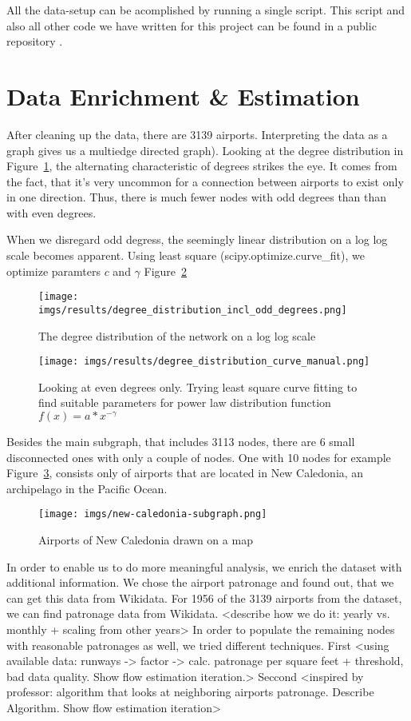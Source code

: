 \documentclass[twocolumn]{tum-article}
\begin{document}
All the data-setup can be acomplished by running a single script.
This script and also all other code we have written for this project can be found in a public repository \cite{repository}.

\section{Data Enrichment \& Estimation}
After cleaning up the data, there are 3139 airports. 
Interpreting the data as a graph gives us a multiedge directed graph).
Looking at the degree distribution in Figure~\ref{fig:degree_distribution}, the alternating characteristic of degrees strikes the eye. It comes from the fact, that it's very uncommon for a connection between airports to exist only in one direction. Thus, there is much fewer nodes with odd degrees than than with even degrees. 

When we disregard odd degress, the seemingly linear distribution on a log log scale becomes apparent. Using least square (scipy.optimize.curve\_fit), we optimize paramters $c$ and $\gamma$ Figure~\ref{fig:degree_distribution_curves}

\begin{figure}
	\centering
	\texttt{[image: imgs/results/degree\_distribution\_incl\_odd\_degrees.png]}
	\caption{
The degree distribution of the network on a log log scale }
	\label{fig:degree_distribution}
\end{figure}

\begin{figure}
	\centering
	\texttt{[image: imgs/results/degree\_distribution\_curve\_manual.png]}
	\caption{
Looking at even degrees only. Trying least square curve fitting to find suitable parameters for power law distribution function $f(x) = a * x^{-\gamma}$}
	\label{fig:degree_distribution_curves}
\end{figure}

Besides the main subgraph, that includes 3113 nodes, there are 6 small disconnected ones with only a couple of nodes.
One with 10 nodes for example Figure~\ref{fig:new_caledonia}, consists only of airports that are located in New Caledonia, an archipelago in the Pacific Ocean. 
\begin{figure}
	\centering
	\texttt{[image: imgs/new-caledonia-subgraph.png]}
	\caption{Airports of New Caledonia drawn on a map}
	\label{fig:new_caledonia}
\end{figure}

In order to enable us to do more meaningful analysis, we enrich the dataset with additional information. We chose the airport patronage and found out, that we can get this data from Wikidata. 
For 1956 of the 3139 airports from the dataset, we can find patronage data from Wikidata. 
<describe how we do it: yearly vs. monthly + scaling from other years>
In order to populate the remaining nodes with reasonable patronages as well, we tried different techniques. 
First <using available data: runways -> factor -> calc. patronage per square feet + threshold, bad data quality. Show flow estimation iteration.>
Seccond <inspired by professor: algorithm that looks at neighboring airports patronage. Describe Algorithm. Show flow estimation iteration>
\end{document}
